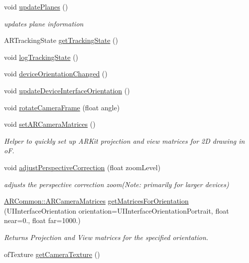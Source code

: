 \begin{DoxyCompactItemize}
void \hyperlink{class_a_r_processor_aaa1488d9082ec598fd4aeb5c5c43d999}{update\+Planes} ()
\begin{DoxyCompactList}\small\item\em updates plane information \end{DoxyCompactList}\item 
A\+R\+Tracking\+State \hyperlink{class_a_r_processor_aa53d195b42b23d9208071692fd5ac28d}{get\+Tracking\+State} ()
\item 
void \hyperlink{class_a_r_processor_a3ae7b56c7d5f555ec84dbd1f1f0a8f65}{log\+Tracking\+State} ()
\item 
void \hyperlink{class_a_r_processor_ac065970f90243b08b9d004a4220d0345}{device\+Orientation\+Changed} ()
\item 
void \hyperlink{class_a_r_processor_a48797c1a249b2f115d0151396bc1eb9c}{update\+Device\+Interface\+Orientation} ()
\item 
void \hyperlink{class_a_r_processor_a2514281144c680e13c02562c74746ceb}{rotate\+Camera\+Frame} (float angle)
\item 
void \hyperlink{class_a_r_processor_a2ffd8b9518388be29eba6affe4d4d152}{set\+A\+R\+Camera\+Matrices} ()
\begin{DoxyCompactList}\small\item\em Helper to quickly set up A\+R\+Kit projection and view matrices for 2D drawing in oF. \end{DoxyCompactList}\item 
void \hyperlink{class_a_r_processor_a17fbdf84c8e82e7f781ea0228d77dfea}{adjust\+Perspective\+Correction} (float zoom\+Level)
\begin{DoxyCompactList}\small\item\em adjusts the perspective correction zoom(\+Note\+: primarily for larger devices) \end{DoxyCompactList}\item 
\hyperlink{struct_a_r_common_1_1_a_r_camera_matrices}{A\+R\+Common\+::\+A\+R\+Camera\+Matrices} \hyperlink{class_a_r_processor_abcd684d805e880aed72c2eb56a65978f}{get\+Matrices\+For\+Orientation} (U\+I\+Interface\+Orientation orientation=U\+I\+Interface\+Orientation\+Portrait, float near=0., float far=1000.)
\begin{DoxyCompactList}\small\item\em Returns Projection and View matrices for the specified orientation. \end{DoxyCompactList}\item 
of\+Texture \hyperlink{class_a_r_processor_a5eb8045000bc6e0ad3d41d7bbf832047}{get\+Camera\+Texture} ()

\end{DoxyCompactItemize}

